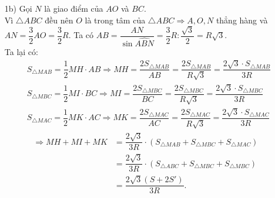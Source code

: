 \begin{ex}
{\begin{enumerate}
			Ta có $\widehat{BMC}$ là góc nội tiếp chắn cung $\wideparen{BAC}$ của đường tròn $(O)$ nên $\widehat{BMC} = \dfrac{1}{2} \text{sđ} \widehat{BAC} = \dfrac{1}{2} \cdot 240^\circ = 120^\circ \Rightarrow \widehat{BME} = 180^\circ - \widehat{BMC} = 180^\circ - 120^\circ = 60^\circ~~(2)$. \\
			Từ $(1)$ và $(2) \Rightarrow \triangle BME$ đều $\Rightarrow BE = BM = EM$. \\
			Xét $\triangle BMA$ và $\triangle BEC$, ta có:
				\begin{align*}
					&BM=BE~\text{(cmt)} \\
					&\widehat{BAM} = \widehat{BCE}~\text{(cùng chắn cung nhỏ } BM) \\
					&BA=BC~\text{(do } \triangle ABC \text{ đều)}
				\end{align*}
			Vậy $\triangle BMA = \triangle BEC \Rightarrow MA = EC \Rightarrow MB+MC=ME+MC=EC=MA$.
			\item[1b)] Gọi $N$ là giao điểm của $AO$ và $BC$. \\
			Vì $\triangle ABC$ đều nên $O$ là trong tâm của $\triangle ABC \Rightarrow A,O,N$ thẳng hàng và $AN = \dfrac{3}{2} AO = \dfrac{3}{2}R$.
			Ta có $AB = \dfrac{AN}{\sin \widehat{ABN}} = \dfrac{3}{2}R : \dfrac{\sqrt{3}}{2} = R\sqrt{3}$. \\
			Ta lại có:
			\begin{align*}
				&S_{\triangle MAB} = \dfrac{1}{2}MH \cdot AB \Rightarrow MH = \dfrac{2S_{\triangle MAB}}{AB} = \dfrac{2S_{\triangle MAB}}{R\sqrt{3}} = \dfrac{2\sqrt{3} \cdot S_{\triangle MAB}}{3R} \\
				&S_{\triangle MBC} = \dfrac{1}{2}MI \cdot BC \Rightarrow MI = \dfrac{2S_{\triangle MBC}}{BC} = \dfrac{2S_{\triangle MBC}}{R\sqrt{3}} = \dfrac{2\sqrt{3} \cdot S_{\triangle MBC}}{3R} \\
				&S_{\triangle MAC} = \dfrac{1}{2}MK \cdot AC \Rightarrow MK = \dfrac{2S_{\triangle MAC}}{AC} = \dfrac{2S_{\triangle MAC}}{R\sqrt{3}} = \dfrac{2\sqrt{3} \cdot S_{\triangle MAC}}{3R}
			\end{align*}
			\begin{align*}
				\Rightarrow MH + MI + MK &= \dfrac{2\sqrt{3}}{3R} \cdot  \left(S_{\triangle MAB} + S_{\triangle MBC} + S_{\triangle MAC}\right) \\
				&=\dfrac{2\sqrt{3}}{3R} \cdot \left(S_{\triangle ABC} + S_{\triangle MBC} + S_{\triangle MBC}\right) \\
				&=\dfrac{2\sqrt{3} \left(S + 2S'\right)}{3R}.
			\end{align*}

\end{enumerate}}
\end{ex}
